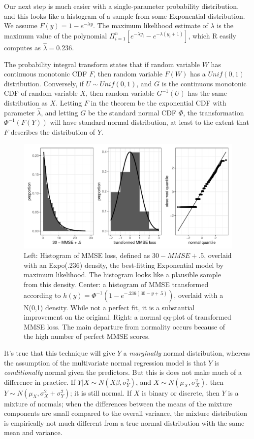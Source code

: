 \documentclass[12pt]{article}
\begin{document}
Our next step is much easier with a single-parameter probability distribution, and this looks like a histogram of a sample from some Exponential distribution. We assume $F(y) = 1 - e^{-\lambda y}$. The maximum likelihood estimate of $\lambda$ is the maximum value of the polynomial $\Pi_{i=1}^{n}\left[ e^{-\lambda y_i} - e^{-\lambda (y_i + 1)} \right]$, which R easily computes as $\hat{\lambda} = 0.236$. 

The probability integral transform states that if random variable $W$ has continuous monotonic CDF $F$, then random variable $F(W)$ has a $Unif(0,1)$ distribution. Conversely, if $U \sim Unif(0,1)$, and $G$ is the continuous monotonic CDF of random variable $X$, then random variable $G^{-1}(U)$ has the same distribution as $X$. Letting $F$ in the theorem be the exponential CDF with parameter $\hat{\lambda}$, and letting $G$ be the standard normal CDF $\Phi$, the transformation $\Phi^{-1}(F(Y))$ will have standard normal distribution, at least to the extent that $F$ describes the distribution of $Y$. 

\begin{figure}[H]
\centering
\includegraphics[width=\linewidth]{figures/mmse_after}
\caption{Left: Histogram of MMSE loss, defined as $30 - MMSE + .5$, overlaid with an Expo(.236) density, the best-fitting Exponential model by maximum likelihood. The histogram looks like a plausible sample from this density. Center: a histogram of MMSE transformed according to $h(y) = \Phi^{-1}(1 - e^{-.236(30-y+.5)})$, overlaid with a N(0,1) density. While not a perfect fit, it is a substantial improvement on the original. Right: a normal qq-plot of transformed MMSE loss. The main departure from normality occurs because of the high number of perfect MMSE scores.}
\end{figure}

It's true that this technique will give $Y$ a \textit{marginally} normal distribution, whereas the assumption of the multivariate normal regression model is that $Y$ is \textit{conditionally} normal given the predictors. But this is does not make much of a difference in practice. If $Y|X \sim N(X\beta, \sigma_{Y}^{2})$, and $X \sim N(\mu_X, \sigma_{X}^{2})$, then $Y \sim N(\mu_X, \sigma_{X}^{2} + \sigma_{Y}^{2})$; it is still normal. If $X$ is binary or discrete, then $Y$ is a mixture of normals; when the differences between the means of the mixture components are small compared to the overall variance, the mixture distribution is empirically not much different from a true normal distribution with the same mean and variance. 
\end{document}
